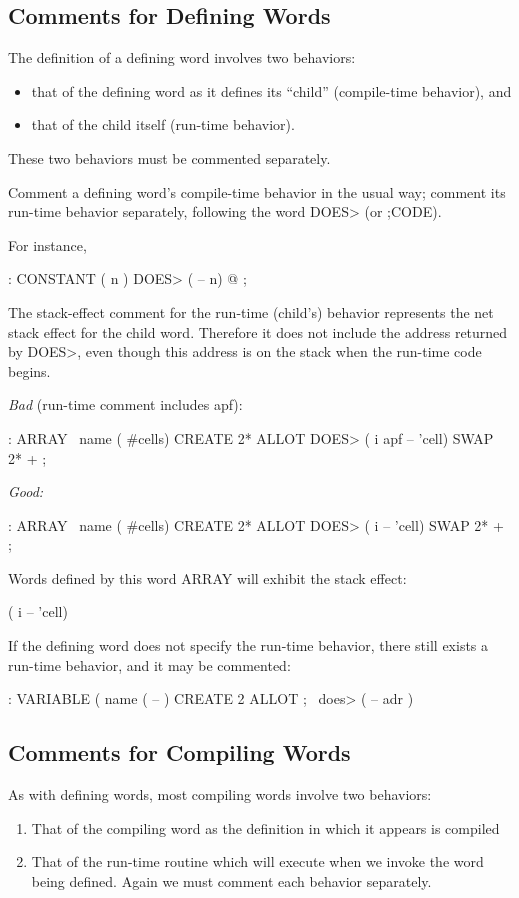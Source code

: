 \subsection{Comments for Defining Words}
The definition of a defining word involves two behaviors:
\begin{itemize}
\item that of the defining word as it defines its ``child''
(compile-time behavior), and
\item that of the child itself (run-time behavior).
\end{itemize}
These two behaviors must be commented separately.

\begin{tip}
Comment a defining word's compile-time behavior in the usual way; comment
its run-time behavior separately, following the word DOES> (or
;CODE).
\end{tip}
For instance,
\begin{Code}
: CONSTANT   ( n )
   DOES> ( -- n)  @ ;
\end{Code}
The stack-effect comment for the run-time (child's) behavior represents
the net stack effect for the child word.  Therefore it does not include the
address returned by DOES>, even though this address is on the stack
when the run-time code begins.

\bigskip\noindent
\emph{Bad} (run-time comment includes apf):
\begin{Code}
: ARRAY    \  name ( #cells)
   CREATE 2* ALLOT
    DOES>   ( i apf -- 'cell)   SWAP  2* + ;
\end{Code}
\goodbreak\noindent
\emph{Good:}
\begin{Code}
: ARRAY \  name ( #cells)
   CREATE 2* ALLOT
    DOES>   ( i -- 'cell)   SWAP  2* + ;
\end{Code}
Words defined by this word ARRAY will exhibit the stack effect:
\begin{Code}
( i -- 'cell)
\end{Code}
If the defining word does not specify the run-time behavior, there still
exists a run-time behavior, and it may be commented:
\begin{Code}
: VARIABLE   ( name ( -- ) CREATE 2 ALLOT ;
   \ does>   ( -- adr )
\end{Code}
\subsection{Comments for Compiling Words}
As with defining words, most compiling words involve two behaviors:
\begin{enumerate}
\item That of the compiling word as the definition in which it appears is compiled
\item That of the run-time routine which will execute when we invoke the word
being defined.  Again we must comment each behavior separately.
\end{enumerate}

